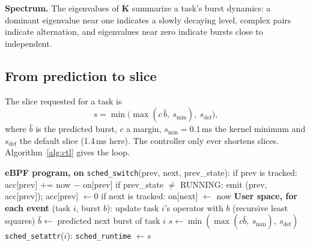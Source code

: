 \documentclass[conference,onecolumn,11pt]{IEEEtran}
\newcommand{\K}{\mathbf{K}}
\begin{document}
\textbf{Spectrum.} The eigenvalues of $\K$ summarize a task's burst dynamics: a dominant eigenvalue near one indicates a slowly decaying level, complex pairs indicate alternation, and eigenvalues near zero indicate bursts close to independent.

\subsection{From prediction to slice}
The slice requested for a task is
\begin{equation}
s=\min\big(\max(c\,\hat b,\ s_{\min}),\ s_{\text{def}}\big),
\end{equation}
where $\hat b$ is the predicted burst, $c$ a margin, $s_{\min}=0.1$\,ms the kernel minimum and $s_{\text{def}}$ the default slice (1.4\,ms here). The controller only ever shortens slices. Algorithm~\ref{alg:ctl} gives the loop.

\begin{algorithm}[t]
\caption{Slice controller (eBPF version)}\label{alg:ctl}
\begin{algorithmic}[1]
\State \textbf{eBPF program, on} \texttt{sched\_switch}(prev, next, prev\_state):
\State \quad if prev is tracked: acc[prev] += now $-$ on[prev]
\State \quad \quad if prev\_state $\neq$ RUNNING: emit (prev, acc[prev]); acc[prev] $\leftarrow 0$
\State \quad if next is tracked: on[next] $\leftarrow$ now
\State \textbf{User space, for each event} (task $i$, burst $b$):
\State \quad update task $i$'s operator with $b$ (recursive least squares)
\State \quad $\hat b \leftarrow$ predicted next burst of task $i$
\State \quad $s \leftarrow \min(\max(c\hat b,\ s_{\min}),\ s_{\text{def}})$
\State \quad \texttt{sched\_setattr}($i$): \texttt{sched\_runtime} $\leftarrow s$
\end{algorithmic}
\end{algorithm}
\end{document}
